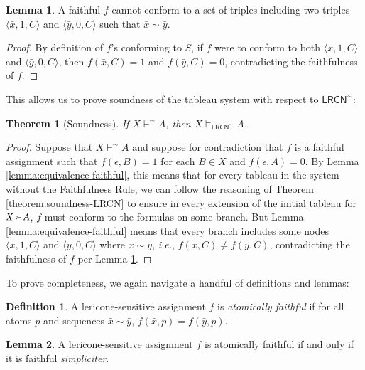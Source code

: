 \documentclass{amsart}
\newtheorem{theorem}{Theorem}
\theoremstyle{definition}
\newtheorem{lemma}{Lemma}
\newtheorem{mdef}{Definition}
\newcommand{\LRCN}{\mathsf{LRCN}}
\begin{document}
\begin{lemma}\label{lemma:faithful-conforming}
    A faithful $f$ cannot conform to a set of triples including two triples $\langle\bar{x},1,C\rangle$ and $\langle\bar{y},0,C\rangle$ such that $\bar{x}\sim\bar{y}$.
\end{lemma}

\begin{proof}
    By definition of $f$'s conforming to $S$, if $f$ were to conform to both $\langle\bar{x},1,C\rangle$ and $\langle\bar{y},0,C\rangle$, then $f(\bar{x},C)=1$ and $f(\bar{y},C)=0$, contradicting the faithfulness of $f$.
\end{proof}

\noindent This allows us to prove soundness of the tableau system with respect to $\LRCN^{\sim}$:

\begin{theorem}[Soundness]
    If $X\vdash^{\sim} A$, then $X\vDash_{\LRCN^{\sim}} A$.
\end{theorem}

\begin{proof}
    Suppose that $X\vdash^{\sim}A$ and suppose for contradiction that $f$ is a faithful assignment such that $f(\epsilon,B)=1$ for each $B\in X$ and $f(\epsilon,A)=0$. By Lemma \ref{lemma:equivalence-faithful}, this means that for every tableau in the system without the Faithfulness Rule, we can follow the reasoning of Theorem \ref{theorem:soundness-LRCN} to ensure in every extension of the initial tableau for $X\Yright A$, $f$ must conform to the formulas on some branch. But Lemma \ref{lemma:equivalence-faithful} means that every branch includes some nodes $\langle \bar{x},1,C\rangle$ and $\langle\bar{y},0,C\rangle$ where $\bar{x}\sim\bar{y}$, \emph{i.e.}, $f(\bar{x},C)\neq f(\bar{y},C)$, contradicting the faithfulness of $f$ per Lemma \ref{lemma:faithful-conforming}.
\end{proof}

\noindent To prove completeness, we again navigate a handful of definitions and lemmas:

\begin{mdef}
    A lericone-sensitive assignment $f$ is \emph{atomically faithful} if for all atoms $p$ and sequences $\bar{x}\sim\bar{y}$, $f(\bar{x},p)=f(\bar{y},p)$.
\end{mdef}

\begin{lemma}\label{lemma:atomic-faithful}
    A lericone-sensitive assignment $f$ is atomically faithful if and only if it is faithful \emph{simpliciter}.
\end{lemma}
\end{document}
